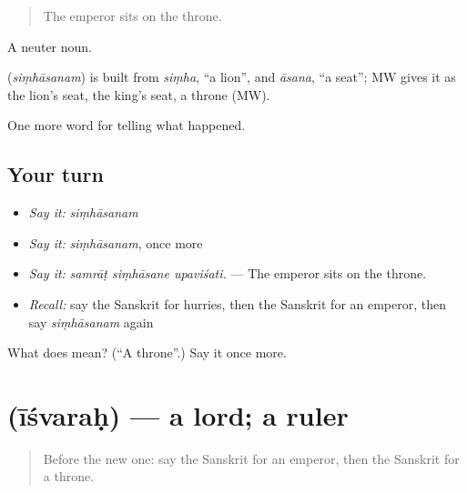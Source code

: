 \begin{quote}
The emperor sits on the throne.
\end{quote}

A neuter noun.

\begin{cousinweb}
\textbf{} (\emph{siṃhāsanam}) is built from \emph{siṃha}, \textquotedblleft{}a lion\textquotedblright{}, and \emph{āsana}, \textquotedblleft{}a seat\textquotedblright{}; MW gives it as the lion's seat, the king's seat, a throne (MW).
\end{cousinweb}

\begin{grammarlens}[title={What you've built}]
One more word for telling what happened.
\end{grammarlens}

\subsection*{Your turn}
\begin{itemize}
\raggedright
  \item \emph{Say it:} \emph{siṃhāsanam}
  \item \emph{Say it:} \emph{siṃhāsanam}, once more
  \item \emph{Say it:} \emph{samrāṭ siṃhāsane upaviśati.} — The emperor sits on the throne.
  \item \emph{Recall:} say the Sanskrit for hurries, then the Sanskrit for an emperor, then say \emph{siṃhāsanam} again
\end{itemize}

\begin{tcolorbox}[breakable,colback=teal!4,colframe=teal!35!black,title={Before you move on}]
What does  mean? (\textquotedblleft{}A throne\textquotedblright{}.) Say it once more.
\end{tcolorbox}
\section[\texorpdfstring{\sk{ईश्वरः} (īśvaraḥ)}{ईश्वरः (īśvaraḥ)}]{ (īśvaraḥ) — a lord; a ruler}

\label{lesson:SA-C316-isvarah}



\begin{quote}
Before the new one: say the Sanskrit for an emperor, then the Sanskrit for a throne.
\end{quote}


